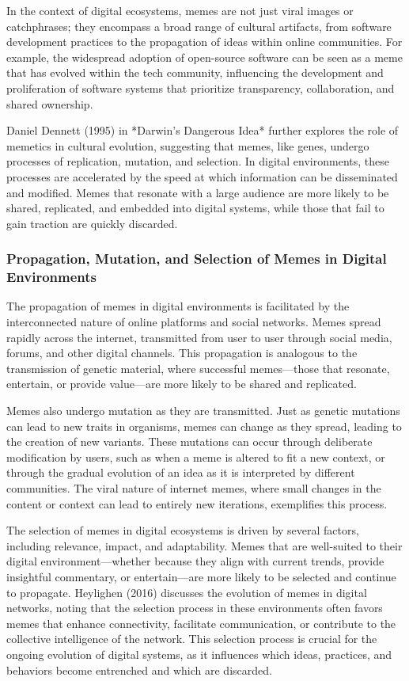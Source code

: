 \documentclass[12pt,twoside]{article}
\begin{document}
In the context of digital ecosystems, memes are not just viral images or catchphrases; they encompass a broad range of cultural artifacts, from software development practices to the propagation of ideas within online communities. For example, the widespread adoption of open-source software can be seen as a meme that has evolved within the tech community, influencing the development and proliferation of software systems that prioritize transparency, collaboration, and shared ownership.

Daniel Dennett (1995) in *Darwin's Dangerous Idea* further explores the role of memetics in cultural evolution, suggesting that memes, like genes, undergo processes of replication, mutation, and selection. In digital environments, these processes are accelerated by the speed at which information can be disseminated and modified. Memes that resonate with a large audience are more likely to be shared, replicated, and embedded into digital systems, while those that fail to gain traction are quickly discarded.

\subsubsection{Propagation, Mutation, and Selection of Memes in Digital Environments}

The propagation of memes in digital environments is facilitated by the interconnected nature of online platforms and social networks. Memes spread rapidly across the internet, transmitted from user to user through social media, forums, and other digital channels. This propagation is analogous to the transmission of genetic material, where successful memes—those that resonate, entertain, or provide value—are more likely to be shared and replicated.

Memes also undergo mutation as they are transmitted. Just as genetic mutations can lead to new traits in organisms, memes can change as they spread, leading to the creation of new variants. These mutations can occur through deliberate modification by users, such as when a meme is altered to fit a new context, or through the gradual evolution of an idea as it is interpreted by different communities. The viral nature of internet memes, where small changes in the content or context can lead to entirely new iterations, exemplifies this process.

The selection of memes in digital ecosystems is driven by several factors, including relevance, impact, and adaptability. Memes that are well-suited to their digital environment—whether because they align with current trends, provide insightful commentary, or entertain—are more likely to be selected and continue to propagate. Heylighen (2016) discusses the evolution of memes in digital networks, noting that the selection process in these environments often favors memes that enhance connectivity, facilitate communication, or contribute to the collective intelligence of the network. This selection process is crucial for the ongoing evolution of digital systems, as it influences which ideas, practices, and behaviors become entrenched and which are discarded.
\end{document}
